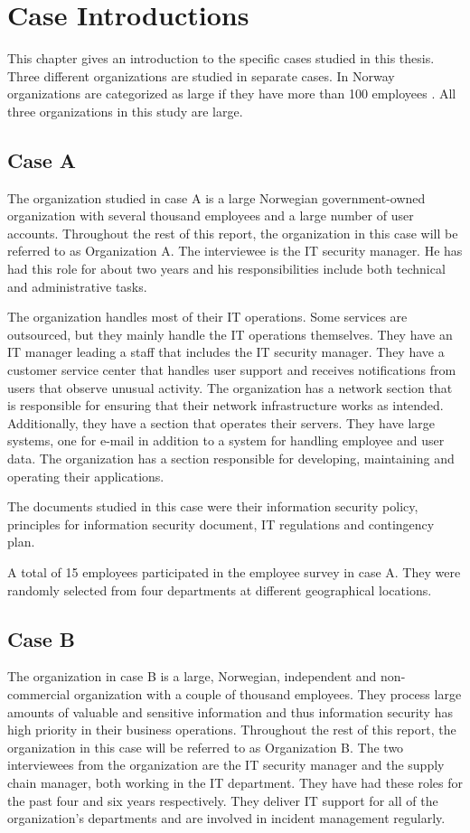 \chapter{Case Introductions}
\label{chp:CaseIntroductions}
This chapter gives an introduction to the specific cases studied in this thesis. Three  different organizations are studied in separate cases. In Norway organizations are categorized as large if they have more than 100 employees \cite{SMB}. All three organizations in this study are large.

\section{Case A}
The organization studied in case A is a large Norwegian government-owned organization with several thousand employees and a large number of user accounts. Throughout the rest of this report, the organization in this case will be referred to as Organization A. The interviewee is the IT security manager. He has had this role for about two years and his responsibilities include both technical and administrative tasks. 

The organization handles most of their IT operations. Some services are outsourced, but they mainly handle the IT operations themselves. They have an IT manager leading a staff that includes the IT security manager. They have a customer service center that handles user support and receives notifications from users that observe unusual activity. The organization has a network section that is responsible for ensuring that their network infrastructure works as intended. Additionally, they have a section that operates their servers. They have large systems, one for e-mail in addition to a system for handling employee and user data. The organization has a section responsible for developing, maintaining and operating their applications.

The documents studied in this case were their information security policy, principles for information security document, IT regulations and contingency plan.

A total of 15 employees participated in the employee survey in case A. They were randomly selected from four departments at different geographical locations. 

\section{Case B}
The organization in case B is a large, Norwegian, independent and non-commercial organization with a couple of thousand employees. They process large amounts of valuable and sensitive information and thus information security has high priority in their business operations. Throughout the rest of this report, the organization in this case will be referred to as Organization B. The two interviewees from the organization are the IT security manager and the supply chain manager, both working in the IT department. They have had these roles for the past four and six years respectively. They deliver IT support for all of the organization's departments and are involved in incident management regularly.   

